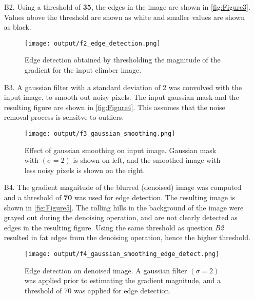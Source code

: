 \documentclass[12pt]{report}
\begin{document}
\begin{enumerate}
    \item[B2.] Using a threshold of \textbf{35}, the edges in the image are shown in \autoref{fig:Figure3}. Values above the threshold are shown as white and smaller 
    values are shown as black.
    \begin{figure}[H]
        \centering
        \texttt{[image: output/f2\_edge\_detection.png]}
        \caption{Edge detection obtained by thresholding the magnitude of the gradient for the input climber image.}
        \label{fig:Figure3}
    \end{figure}

    \item[B3.] A gaussian filter with a standard deviation of 2 was convolved with the input image, to smooth out noisy pixels. The input gaussian mask and the resulting 
    figure are shown in \autoref{fig:Figure4}. This assumes that the noise removal process is sensitve to outliers.
    \begin{figure}[H]
        \centering
        \texttt{[image: output/f3\_gaussian\_smoothing.png]}
        \caption{Effect of gaussian smoothing on input image. Gaussian mask with $(\sigma=2)$ is shown on left, and the smoothed image with less noisy pixels is shown on the 
        right.}
        \label{fig:Figure4}
    \end{figure}

    \item[B4.] The gradient magnitude of the blurred (denoised) image was computed and a threshold of \textbf{70} was used for edge detection. The resulting image is shown 
    in \autoref{fig:Figure5}. The rolling hills in the background of the image were grayed out during the denoising operation, and are not clearly detected as edges in the 
    resulting figure. Using the same threshold as question \emph{B2} resulted in fat edges from the denoising operation, hence the higher threshold.
    \begin{figure}[H]
        \centering
        \texttt{[image: output/f4\_gaussian\_smoothing\_edge\_detect.png]}
        \caption{Edge detection on denoised image. A gaussian filter $(\sigma=2)$ was applied prior to estimating the gradient magnitude, and a threshold of 70 was applied 
        for edge detection.}
        \label{fig:Figure5}
    \end{figure}


\end{enumerate}
\end{document}
